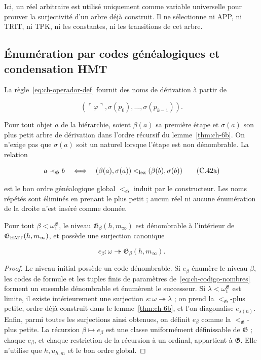 Ici, un réel arbitraire est utilisé uniquement comme variable universelle pour prouver
la surjectivité d’un arbre déjà construit. Il ne sélectionne ni APP, ni TRIT, ni TPK, ni les
constantes, ni les transitions de cet arbre.

\subsection{Énumération par codes généalogiques et condensation HMT}

La règle~\eqref{eq:ch-operador-def} fournit des noms de dérivation à partir de

\[
 (\ulcorner\varphi\urcorner,
  \sigma(p_0),\ldots,\sigma(p_{k-1})).
\tag{C.42}\label{eq:ch-codigo-nombres}
\]

Pour tout objet \(a\) de la hiérarchie, soient \(\beta(a)\) sa première
étape et \(\sigma(a)\) son plus petit arbre de dérivation dans l’ordre récursif du
lemme~\ref{thm:ch-6b}. On n’exige pas que \(\sigma(a)\) soit un naturel lorsque l’étape est non
dénombrable. La relation

\[
 a\prec_{\mathfrak G}b
 \quad\Longleftrightarrow\quad
 (\beta(a),\sigma(a))<_{\rm lex}
 (\beta(b),\sigma(b))
\tag{C.42a}\label{eq:ch-orden-genealogico}
\]

est le bon ordre généalogique global \(<_{\mathfrak G}\) induit par le
constructeur. Les noms répétés sont éliminés en prenant le plus petit ; aucun réel
ni aucune énumération de la droite n’est inséré comme donnée.

\begin{lemma}
\label{thm:ch-7}
Pour tout \(\beta<\omega_1^{\mathfrak G}\), le niveau \(\mathfrak G_\beta(h,m_\infty)\) est dénombrable à l'intérieur de \(\mathfrak G_{\rm HMT}(h,m_\infty)\), et possède une surjection canonique

\[
 e_\beta:\omega\twoheadrightarrow
 \mathfrak G_\beta(h,m_\infty).
\tag{C.43}\label{eq:ch-enumeracion-niveles}
\]

\end{lemma}
\begin{proof}
Le niveau initial possède un code dénombrable. Si \(e_\beta\) énumère le niveau \(\beta\), les codes de formule et les tuples finis de paramètres de~\eqref{eq:ch-codigo-nombres} forment un ensemble dénombrable et énumèrent le successeur. Si \(\lambda<\omega_1^{\mathfrak G}\) est limite, il existe intérieurement une surjection \(s:\omega\twoheadrightarrow\lambda\) ; on prend la \(<_{\mathfrak G}\)-plus petite, ordre déjà construit dans le lemme~\ref{thm:ch-6b}, et l'on diagonalise \(e_{s(n)}\). Enfin, parmi toutes les surjections ainsi obtenues, on définit \(e_\beta\) comme la \(<_{\mathfrak G}\)-plus petite. La récursion \(\beta\mapsto e_\beta\) est une classe uniformément définissable de \(\mathfrak G\) ; chaque \(e_\beta\), et chaque restriction de la récursion à un ordinal, appartient à \(\mathfrak G\). Elle n'utilise que \(h,u_{h,m}\) et le bon ordre global.
\end{proof}

